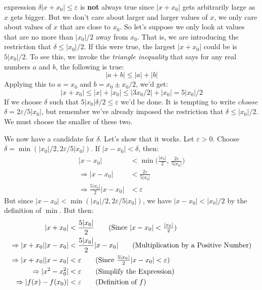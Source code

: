 \documentclass{article}
\theoremstyle{normal}
\begin{document}
    expression $\delta|x+x_{0}|\leq\varepsilon$ is \textbf{not} always true
    since $|x+x_{0}|$ gets arbitrarily large as $x$ gets bigger. But we don't
    care about larger and larger values of $x$, we only care about values of
    $x$ that are close to $x_{0}$. So let's suppose we only look at values that
    are no more than $|x_{0}|/2$ away from $x_{0}$. That is, we are introducing
    the restriction that $\delta\leq|x_{0}|/2$. If this were true, the largest
    $|x+x_{0}|$ could be is $5|x_{0}|/2$. To see this, we invoke the
    \textit{triangle inequality} that says for any real numbers $a$ and $b$,
    the following is true:
    \begin{equation}
        |a+b|\leq|a|+|b|
    \end{equation}
    Applying this to $a=x_{0}$ and $b=x_{0}\pm{x}_{0}/2$, we'd get:
    \begin{equation}
        |x+x_{0}|\leq|x|+|x_{0}|\leq|3x_{0}/2|+|x_{0}|=5|x_{0}|/2
    \end{equation}
    If we choose $\delta$ such that $5|x_{0}|\delta/2\leq\varepsilon$ we'd be
    done. It is tempting to write \textit{choose}
    $\delta=2\varepsilon/5|x_{0}|$, but remember we've already imposed the
    restriction that $\delta\leq|x_{0}|/2$. We must choose the smaller of these
    two.
    \par\hfill\par
    We now have a candidate for $\delta$. Let's show that it works. Let
    $\varepsilon>0$. Choose $\delta=\min(|x_{0}|/2,2\varepsilon/5|x_{0}|)$. If
    $|x-x_{0}|<\delta$, then:
    \begin{align}
        |x-x_{0}|&<\min\Big(
            \frac{|x_{0}|}{2},\,
            \frac{2\varepsilon}{5|x_{0}|}
        \Big)
            \tag{Definition of $\delta$}\\
        \Rightarrow
            |x-x_{0}|&<\frac{2\varepsilon}{5|x_{0}|}
                \tag{Definition of $\min$}\\
        \Rightarrow
            \frac{5|x_{0}|}{2}|x-x_{0}|&<\varepsilon
                \tag{Multiplication by a Positive Number}
    \end{align}
    But since $|x-x_{0}|<\min(|x_{0}|/2,2\varepsilon/5|x_{0}|)$, we have
    $|x-x_{0}|<|x_{0}|/2$ by the definition of $\min$. But then:
    \begin{align}
        |x+x_{0}|&<\frac{5|x_{0}|}{2}
            \tag{Since $|x-x_{0}|<\frac{|x_{0}|}{2}$}\\
        \Rightarrow
            |x+x_{0}||x-x_{0}|&<\frac{5|x_{0}|}{2}|x-x_{0}|
                \tag{Multiplication by a Positive Number}\\
        \Rightarrow
            |x+x_{0}||x-x_{0}|&<\varepsilon
                \tag{Since $\frac{5|x_{0}|}{2}|x-x_{0}|<\varepsilon$}\\
        \Rightarrow
            |x^{2}-x_{0}^{2}|&<\varepsilon
                \tag{Simplify the Expression}\\
        \Rightarrow
            |f(x)-f(x_{0})|&<\varepsilon
                \tag{Definition of $f$}
    \end{align}
\end{document}
